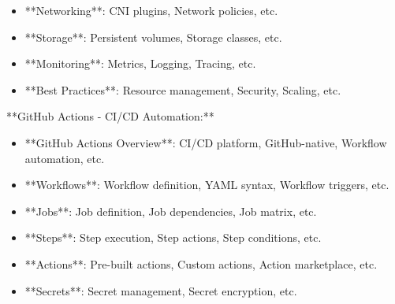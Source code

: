 \documentclass[11pt,a4paper]{article}
\begin{document}
\begin{itemize}
\item **Networking**: CNI plugins, Network policies, etc.
\end{itemize}

\begin{itemize}
\item **Storage**: Persistent volumes, Storage classes, etc.
\end{itemize}

\begin{itemize}
\item **Monitoring**: Metrics, Logging, Tracing, etc.
\end{itemize}

\begin{itemize}
\item **Best Practices**: Resource management, Security, Scaling, etc.
\end{itemize}

**GitHub Actions - CI/CD Automation:**

\begin{itemize}
\item **GitHub Actions Overview**: CI/CD platform, GitHub-native, Workflow automation, etc.
\end{itemize}

\begin{itemize}
\item **Workflows**: Workflow definition, YAML syntax, Workflow triggers, etc.
\end{itemize}

\begin{itemize}
\item **Jobs**: Job definition, Job dependencies, Job matrix, etc.
\end{itemize}

\begin{itemize}
\item **Steps**: Step execution, Step actions, Step conditions, etc.
\end{itemize}

\begin{itemize}
\item **Actions**: Pre-built actions, Custom actions, Action marketplace, etc.
\end{itemize}

\begin{itemize}
\item **Secrets**: Secret management, Secret encryption, etc.
\end{itemize}
\end{document}
